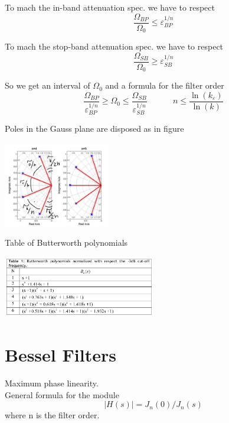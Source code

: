 To mach the in-band attenuation spec. we have to respect
\begin{equation}
\frac{\Omega_{BP}}{\Omega_0}\le \varepsilon_{BP}^{1/n}
\end{equation}

To mach the stop-band attenuation spec. we have to respect
\begin{equation}
\frac{\Omega_{SB}}{\Omega_0}\ge \varepsilon_{SB}^{1/n}
\end{equation}

So we get an interval of $\Omega_0$ and a formula for the filter order
\begin{equation}
\frac{\Omega_{BP}}{\varepsilon_{BP}^{1/n}} \ge \Omega_0 \le \frac{\Omega_{SB}}{\varepsilon_{SB}^{1/n}} \ \ \ \ \ \ \ \ \ \ \ \ \ \ n\le \frac{\ln(k_{\varepsilon})}{\ln(k)}
\end{equation}

Poles in the Gauss plane are disposed as in figure


\centering
\includegraphics[width=0.35\textwidth]{Gaussbutt.png}\\
\raggedright

Table of Butterworth polynomials

\centering
\includegraphics[width=0.5\textwidth]{butt.png}\\
\raggedright


\section{Bessel Filters}

Maximum phase linearity.\\
General formula for the module 
\begin{equation}
|H(s)|=J_n(0)/J_n(s)
\end{equation}
where n is the filter order.

